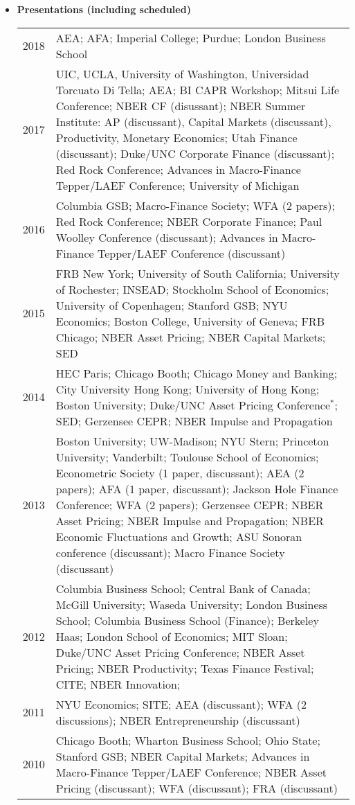 \documentclass[11pt,letterpaper,serif,overlapped]{res}
\begin{document}
\begin{resume}
\begin{itemize}
\item \textbf{Presentations (including scheduled)}
\begin{longtable}{lp{15cm}}
2018 & AEA; AFA; Imperial College; Purdue; London Business School\\
2017 & UIC, UCLA, University of Washington, Universidad Torcuato Di Tella; AEA; BI CAPR Workshop; Mitsui Life Conference; NBER CF (disussant); NBER Summer Institute:  AP (discussant), Capital Markets (discussant),  Productivity, Monetary Economics; Utah Finance (discussant); Duke/UNC Corporate Finance (discussant); Red Rock Conference; Advances in Macro-Finance Tepper/LAEF Conference; University of Michigan\\[0.1cm]
2016 & Columbia GSB;  Macro-Finance Society; WFA (2 papers); Red Rock Conference; NBER Corporate Finance; Paul Woolley Conference (discussant); Advances in Macro-Finance Tepper/LAEF Conference (discussant)\\[0.1cm]
2015 & FRB New York; University of South California; University of Rochester; INSEAD; Stockholm School of Economics; University of Copenhagen; Stanford GSB; NYU Economics; Boston College, University of Geneva; FRB Chicago; NBER Asset Pricing;  NBER Capital Markets; SED\\[0.1cm]
2014 &HEC Paris; Chicago Booth; Chicago Money and Banking; City University Hong Kong; University of Hong Kong; Boston University; Duke/UNC Asset Pricing Conference$^*$; SED; Gerzensee CEPR; NBER Impulse and Propagation\\[0.1cm]
2013 & Boston University; UW-Madison; NYU Stern; Princeton University; Vanderbilt; Toulouse School of Economics;  Econometric Society (1 paper, discussant); AEA (2 papers); AFA (1 paper, discussant); Jackson Hole Finance Conference; WFA (2 papers); Gerzensee CEPR; NBER Asset Pricing; NBER Impulse and Propagation;  NBER Economic Fluctuations and Growth; ASU Sonoran conference (discussant); Macro Finance Society (discussant) \\[0.1cm]
2012 & Columbia Business School; Central Bank of Canada; McGill University; Waseda University; London Business School; Columbia Business School (Finance); Berkeley Haas;  London School of Economics; MIT Sloan; Duke/UNC Asset Pricing Conference; NBER Asset Pricing; NBER Productivity; Texas Finance Festival; CITE; NBER Innovation;\\[0.1cm]
2011 & NYU Economics;  SITE; AEA (discussant); WFA (2 discussions); NBER Entrepreneurship (discussant) \\[0.1cm]
2010 & Chicago Booth; Wharton Business School; Ohio State; Stanford GSB; NBER Capital Markets; Advances in Macro-Finance Tepper/LAEF Conference; NBER Asset Pricing (discussant); WFA (discussant); FRA (discussant)  \\[0.1cm]

\end{longtable}
\end{itemize}
\end{resume}
\end{document}

